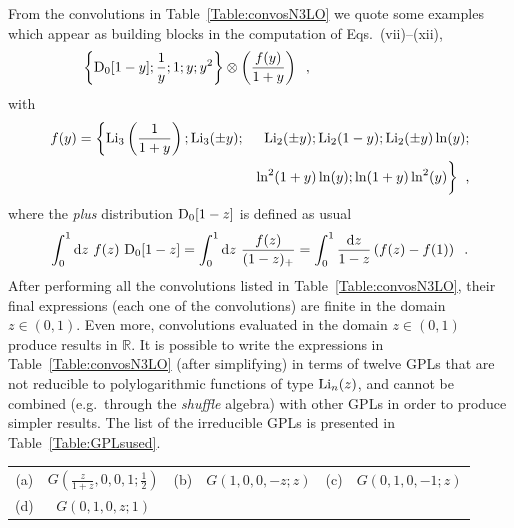 \documentclass[12pt]{article}
\def\beeq{\begin{eqnarray}}
\def\eeeq{\end{eqnarray}}
\def\nn{\nonumber}
\newcommand\f[2]{\frac{#1}{#2}}
\DeclareRobustCommand{\rd}{\ensuremath{\mathrm{d}}}
\begin{document}
\begin{appendix}
From the convolutions in Table~\ref{Table:convosN3LO} we quote some  examples which appear as building blocks in the computation of Eqs.~(vii)--(xii),
\beeq
\!\!\!\!\!\!\!\!\!\!\!\!&&\!\!\!\!\!\!\!\!\!\!\!\!\!\!\!\!\!\!\!\!\!\!\!\!\!\!\!\!\!\!\!\!\!\!\!\!\!\!\!\!\!\!\!\!\!\!\!\!\bigg\{{\rm D}_{0}[1-y];\f{1}{y};1;y;y^{2}\bigg\} \otimes \left( \f{f(y)}{1+y} \right)\;\;,
\eeeq
with 
\beeq 
f(y)=\bigg\{{\rm Li}_{3}\left(\f{1}{1+y}\right); {\rm Li}_{3}(\pm y);&&\!\!\!\!\!\!\!\!\!{\rm Li}_{2}(\pm y); {\rm Li}_{2}(1- y); {\rm Li}_{2}(\pm y) \ln(y);\nn\\
&&\ln^{2}(1+y)\ln(y);\ln(1+y)\ln^{2}(y)\bigg\}\;\;,
\eeeq
where the \textit{plus} distribution ${\rm D}_{0}[1-z]$ is defined as usual 
\beeq
\int^{1}_{0}\rd z~f(z)~{\rm D}_{0}[1-z] =\int^{1}_{0}\rd z~\f{f(z)}{(1-z)_{+}} = \int^{1}_{0}\f{\rd z}{1-z}\left( f(z)-f(1)\right)\;\;.
\eeeq
After performing all the convolutions listed in Table~\ref{Table:convosN3LO}, their final expressions (each one of the convolutions) are finite in the domain $z\in (0,1)$. Even more, convolutions evaluated in the domain $z\in (0,1)$ produce results in $\mathbb{R}$. It is possible to write the expressions in Table~\ref{Table:convosN3LO} (after simplifying) in terms of twelve GPLs that are not reducible to polylogarithmic functions of type ${\rm Li}_n(z)$, 
 and cannot be combined (e.g.\ through the \textit{shuffle} algebra) with other GPLs in order to produce simpler results. 
The list of the irreducible GPLs is presented in Table~\ref{Table:GPLsused}.
\begin{table}
\begin{center}
\renewcommand{\arraystretch}{1.5}
\begin{tabular}{ |c|c||c|c||c|c| }
\hline
\multirow{1}{*}{(a)} 

& $G(\f{z}{1+z},0,0,1;\f{1}{2})$

& \multirow{1}{*}{(b)} 

& $G(1,0,0,-z;z)$ 

& \multirow{1}{*}{(c)} 

& $G(0,1,0,-1;z)$  \\

\multirow{1}{*}{(d)} 

& $G(0,1,0,z;1)$


\end{tabular}
\end{center}
\end{table}
\end{appendix}
\end{document}
